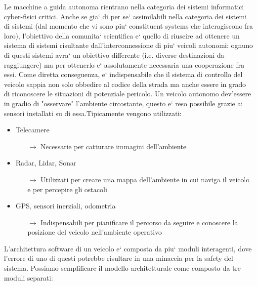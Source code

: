 Le macchine a guida autonoma rientrano nella categoria dei sistemi informatici cyber-fisici critici. Anche se gia` di per se` assimilabili nella categoria dei sistemi di sistemi (dal momento che vi sono piu` constituent systems che interagiscono fra loro), l'obiettivo della comunita` scientifica e` quello di riuscire ad ottenere un sistema di sistemi risultante dall'interconnessione di piu` veicoli autonomi: ognuno di questi sistemi avra` un obiettivo differente (i.e. diverse destinazioni da raggiungere) ma per ottenerlo e` assolutamente necessaria una cooperazione fra essi. Come diretta conseguenza, e` indispensabile che il sistema di controllo del veicolo sappia non solo obbedire al codice della strada ma anche essere in grado di riconoscere le situazioni di potenziale pericolo.\newline
Un veicolo autonomo dev'essere in gradio di "osservare" l'ambiente circostante, questo e` reso possibile grazie ai sensori installati su di essa.\newline\newline Tipicamente vengono utilizzati:
\begin{itemize}
	\item Telecamere
		\begin{itemize}
			\item[$\rightarrow$] Necessarie per catturare immagini dell'ambiente
		\end{itemize}
	\item Radar, Lidar, Sonar
		\begin{itemize}
			\item[$\rightarrow$] Utilizzati per creare una mappa dell'ambiente in cui naviga il veicolo e per percepire gli ostacoli
		\end{itemize}
	\item GPS, sensori inerziali, odometria
		\begin{itemize}
			\item[$\rightarrow$] Indispensabili per pianificare il percorso da seguire e conoscere la posizione del veicolo nell'ambiente operativo
		\end{itemize}
\end{itemize}

\newpage

L'architettura software di un veicolo e` composta da piu` moduli interagenti, dove l'errore di uno di questi potrebbe risultare in una minaccia per la safety del sistema.\newline\newline
Possiamo semplificare il modello architetturale come composto da tre moduli separati:


